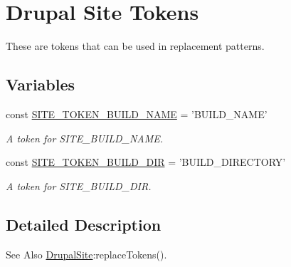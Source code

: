 \hypertarget{group__site__tokens}{\section{Drupal Site Tokens}
\label{group__site__tokens}
}


These are tokens that can be used in replacement patterns.  


\subsection*{Variables}
\begin{DoxyCompactItemize}
\item 
const \hyperlink{group__site__tokens_gabb5bcf41e36db07144b407ef72f9fa61}{S\-I\-T\-E\-\_\-\-T\-O\-K\-E\-N\-\_\-\-B\-U\-I\-L\-D\-\_\-\-N\-A\-M\-E} = 'B\-U\-I\-L\-D\-\_\-\-N\-A\-M\-E'
\begin{DoxyCompactList}\small\item\em A token for S\-I\-T\-E\-\_\-\-B\-U\-I\-L\-D\-\_\-\-N\-A\-M\-E. \end{DoxyCompactList}\item 
const \hyperlink{group__site__tokens_ga1831bee256793ce98d53c98ae6421682}{S\-I\-T\-E\-\_\-\-T\-O\-K\-E\-N\-\_\-\-B\-U\-I\-L\-D\-\_\-\-D\-I\-R} = 'B\-U\-I\-L\-D\-\_\-\-D\-I\-R\-E\-C\-T\-O\-R\-Y'
\begin{DoxyCompactList}\small\item\em A token for S\-I\-T\-E\-\_\-\-B\-U\-I\-L\-D\-\_\-\-D\-I\-R. \end{DoxyCompactList}\end{DoxyCompactItemize}


\subsection{Detailed Description}
\begin{DoxySeeAlso}{See Also}
\hyperlink{classDrupalSite}{Drupal\-Site}\-:replace\-Tokens(). 
\end{DoxySeeAlso}



